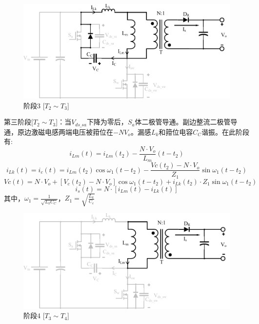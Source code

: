 \documentclass[UTF8]{ctexart}
\numberwithin{equation}{section}
\begin{document}
	\begin{figure}[h]
		\centering
		\includegraphics[scale=0.6]{image/mo3.pdf}
		\caption{阶段3 [$T_2 \sim T_3$]}
	\end{figure}
	
	第三阶段[$T_2 \sim T_3$]：当$V_{ds\_sa}$下降为零后，$S_a$体二极管导通。副边整流二极管导通，原边激磁电感两端电压被箝位在$-NV_o$。漏感$L_k$和箝位电容$C_C$谐振。在此阶段有:
	\begin{equation}
	i_{L m}(t)=i_{Lm}\left(t_{2}\right)-\frac{N \cdot V_o}{L_{m}}\left(t-t_{2}\right)
	\end{equation}
	\begin{equation}
	i_{L k}(t)=i_{c}(t)=i_{L m}\left(t_{2}\right) \cos \omega_{1}\left(t-t_{2}\right)-\frac{V c\left(t_{2}\right)-N \cdot V_o}{Z_{1}} \sin \omega_{1}\left(t-t_{2}\right)
	\end{equation}
	\begin{equation}
	V c(t)=N \cdot V_o+\left[V_c\left(t_{2}\right)-N \cdot V_o\right] \cos \omega_{1}\left(t-t_{2}\right)+i_{L k}\left(t_{2}\right) \cdot Z_{1} \sin \omega_{1}\left(t-t_{2}\right)
	\end{equation}
	\begin{equation}
	i_{s}(t)=N \cdot\left[i_{L m}(t)-i_{L k}(t)\right]
	\end{equation}
	其中，$\omega_{1}=\frac{1}{\sqrt{L_{k} C_{C}}}$，$Z_{1}=\sqrt{\frac{L_{k}}{C_{c}}}$
	
	\begin{figure}[h]
		\centering
		\includegraphics[scale=0.5]{image/mo4.pdf}
		\caption{阶段4 [$T_3 \sim T_4$]}
	\end{figure}
	
\end{document}
